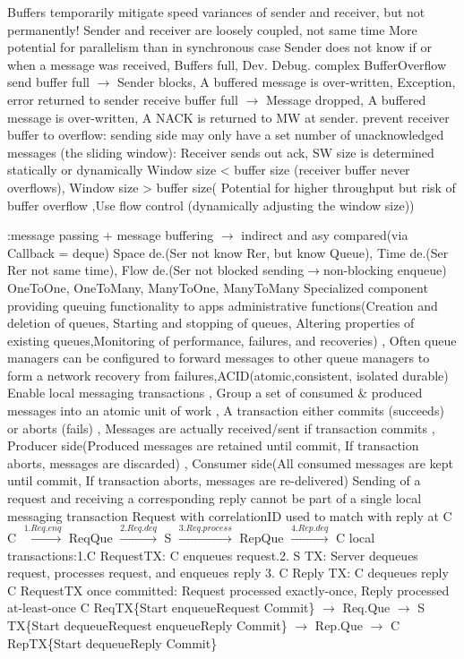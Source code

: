 Buffers temporarily mitigate speed variances of sender and receiver, but not permanently!
\btext{+:}
Sender and receiver are loosely coupled, not same time
More potential for parallelism than in synchronous case
\btext{-:}
Sender does not know if or when a message was received,
Buffers full,
Dev. Debug. complex
\textbar {}
BufferOverflow
send buffer full $\rightarrow$
Sender blocks,
A buffered message is over-written,
Exception, error returned to sender
\textbar
receive buffer full $\rightarrow$
Message dropped,
A buffered message is over-written,
A NACK is returned to MW at sender.
\textbar {}
prevent receiver buffer to overflow:
sending side may only have a set number of unacknowledged messages (the sliding window):
Receiver sends out ack,
SW size is determined statically or dynamically
Window size < buffer size (receiver buffer never overflows),
Window size > buffer size( Potential for higher throughput but risk of buffer overflow
,Use flow control (dynamically adjusting the window size))




:message passing + message buffering
\textbar {} $\rightarrow$ indirect and asy compared(via Callback = deque)
Space de.(Ser not know Rer, but know Queue),
Time de.(Ser Rer not same time),
Flow de.(Ser not blocked sending$\rightarrow$non-blocking enqueue)
\textbar {}
OneToOne, OneToMany, ManyToOne, ManyToMany
\textbar {}
Specialized component providing queuing functionality to apps
administrative functions(Creation and deletion of queues, Starting and stopping of queues,
Altering properties of existing queues,Monitoring of performance, failures, and recoveries)
, Often queue managers can be configured to forward messages to other queue managers to form a network
\textbar {}recovery from failures,ACID(atomic,consistent, isolated durable)
Enable local messaging transactions
, Group a set of consumed \& produced messages into an atomic unit of work
, A transaction either commits (succeeds) or aborts (fails)
, Messages are actually received/sent if transaction commits
, Producer side(Produced messages are retained until commit, If transaction aborts, messages are discarded)
, Consumer side(All consumed messages are kept until commit, If transaction aborts, messages are re-delivered)
Sending of a request and receiving a corresponding reply cannot be part of a single local messaging transaction
\textbar {}Request with correlationID used to match with reply at C
C $\overset{1.Req.enq}{\rightarrow}$ ReqQue $\overset{2.Req.deq}{\rightarrow}$ S
$\overset{3.Req.process}{\rightarrow}$ RepQue $\overset{4.Rep.deq}{\rightarrow}$ C
\textbar {} local transactions:1.C RequestTX: C enqueues request.2. S TX: Server dequeues request, processes request, and enqueues reply
3. C Reply TX: C dequeues reply
\textbar C RequestTX once committed: Request processed exactly-once, Reply processed at-least-once
\textbar C ReqTX\{Start enqueueRequest Commit\} $\rightarrow$ Req.Que 
$\rightarrow$ S TX\{Start dequeueRequest enqueueReply Commit\} $\rightarrow$ Rep.Que 
$\rightarrow$ C RepTX\{Start dequeueReply Commit\}

